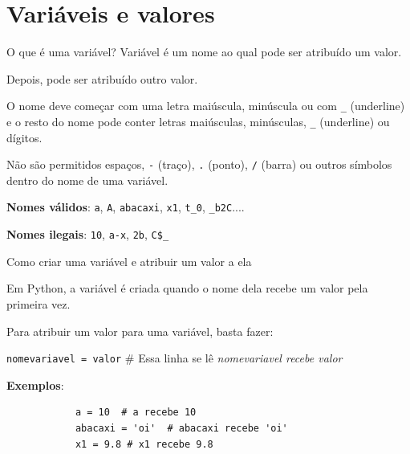 \begin{frame}
	
  \end{frame}  

\frame{}


\section{Variáveis e valores} %

\begin{frame}{O que é uma variável?}
	Variável é um nome ao qual pode ser atribuído um valor.	
	
	Depois, pode ser atribuído outro valor.
	
	\vfill	
	
	O nome deve começar com uma letra maiúscula, minúscula ou com \texttt{\_} (underline)
	e o resto do nome pode conter letras maiúsculas, minúsculas, \texttt{\_} (underline) ou dígitos.
	
	Não são permitidos espaços, \texttt{-} (traço), \texttt{.} (ponto), \texttt{/} (barra) ou outros símbolos dentro do nome de uma variável.

	\vfill
	
	\textbf{Nomes válidos}: \texttt{a}, \texttt{A}, \texttt{abacaxi}, \texttt{x1}, \texttt{t\_0}, \texttt{\_b2C}....	
	
	\textbf{Nomes ilegais}: \texttt{10}, \texttt{a-x}, \texttt{2b}, \texttt{C\$\_}
	
  \end{frame}	
  
\begin{frame}[containsverbatim]{Como criar uma variável e atribuir um valor a ela}
	\large
	
	Em Python, a variável é criada quando o nome dela recebe um valor pela primeira vez.
	
	Para atribuir um valor para uma variável, basta fazer:
	
	\texttt{nomevariavel = valor}
	\hfill 
	\#
	Essa linha se lê \textit{nomevariavel recebe valor}
  \end{frame}  
  
\begin{frame}[containsverbatim]
\textbf{Exemplos}:
	\Large
		\begin{verbatim}
			a = 10	# a recebe 10			
			abacaxi = 'oi'	# abacaxi recebe 'oi'									
			x1 = 9.8 # x1 recebe 9.8
		\end{verbatim}					
\end{frame}  

